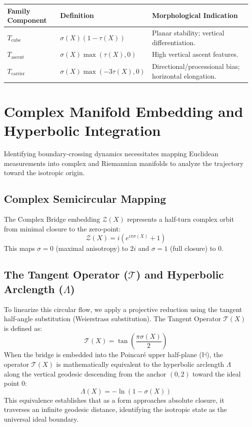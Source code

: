 \documentclass[12pt]{article}
\begin{document}
\begin{table}[h]
\centering
\begin{tabular}{lll}
\toprule
Family Component & Definition & Morphological Indication \\
\midrule
$T_{\mathrm{cube}}$ & $\sigma(X)(1 - \tau(X))$ & Planar stability; vertical differentiation. \\
$T_{\mathrm{ascent}}$ & $\sigma(X) \max(\tau(X), 0)$ & High vertical ascent features. \\
$T_{\mathrm{carrier}}$ & $\sigma(X) \max(-3\tau(X), 0)$ & Directional/processional bias; horizontal elongation. \\
\bottomrule
\end{tabular}
\end{table}

\section{Complex Manifold Embedding and Hyperbolic Integration}
Identifying boundary-crossing dynamics necessitates mapping Euclidean measurements into complex and Riemannian manifolds to analyze the trajectory toward the isotropic origin.

\subsection{Complex Semicircular Mapping}
The Complex Bridge embedding $\mathcal{Z}(X)$ represents a half-turn complex orbit from minimal closure to the zero-point:
$$ \mathcal{Z}(X) = i(e^{i\pi\sigma(X)} + 1) $$
This maps $\sigma=0$ (maximal anisotropy) to $2i$ and $\sigma=1$ (full closure) to $0$.

\subsection{The Tangent Operator ($\mathcal{T}$) and Hyperbolic Arclength ($\Lambda$)}
To linearize this circular flow, we apply a projective reduction using the tangent half-angle substitution (Weierstrass substitution). The Tangent Operator $\mathcal{T}(X)$ is defined as:
$$ \mathcal{T}(X) = \tan\left(\frac{\pi\sigma(X)}{2}\right) $$
When the bridge is embedded into the Poincaré upper half-plane ($\mathbb{H}$), the operator $\mathcal{T}(X)$ is mathematically equivalent to the hyperbolic arclength $\Lambda$ along the vertical geodesic descending from the anchor $(0,2)$ toward the ideal point $0$:
$$ \Lambda(X) = -\ln(1 - \sigma(X)) $$
This equivalence establishes that as a form approaches absolute closure, it traverses an infinite geodesic distance, identifying the isotropic state as the universal ideal boundary.
\end{document}
